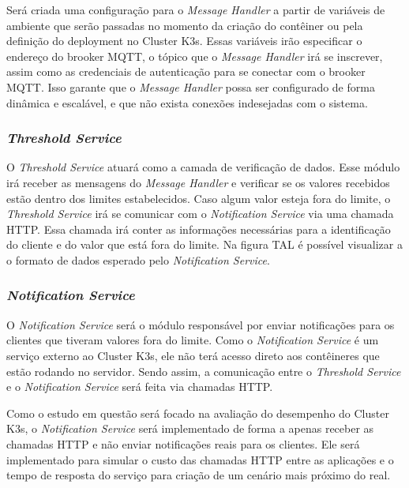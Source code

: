 Será criada uma configuração para o \textit{Message Handler} a partir de variáveis de ambiente que serão passadas no momento da criação do contêiner ou pela definição do deployment no Cluster K3s.
Essas variáveis irão especificar o endereço do brooker MQTT, o tópico que o \textit{Message Handler} irá se inscrever, assim como as credenciais de autenticação para se conectar com o brooker MQTT. 
Isso garante que o \textit{Message Handler} possa ser configurado de forma dinâmica e escalável, e que não exista conexões indesejadas com o sistema.

\subsubsection{\textit{Threshold Service}}

O \textit{Threshold Service} atuará como a camada de verificação de dados. 
Esse módulo irá receber as mensagens do \textit{Message Handler} e verificar se os valores recebidos estão dentro dos limites estabelecidos. 
Caso algum valor esteja fora do limite, o \textit{Threshold Service} irá se comunicar com o \textit{Notification Service} via uma chamada HTTP.
Essa chamada irá conter as informações necessárias para a identificação do cliente e do valor que está fora do limite.
Na figura TAL é possível visualizar a o formato de dados esperado pelo \textit{Notification Service}.

\subsubsection{\textit{Notification Service}}

O \textit{Notification Service} será o módulo responsável por enviar notificações para os clientes que tiveram valores fora do limite.
Como o \textit{Notification Service} é um serviço externo ao Cluster K3s, ele não terá acesso direto aos contêineres que estão rodando no servidor. 
Sendo assim, a comunicação entre o \textit{Threshold Service} e o \textit{Notification Service} será feita via chamadas HTTP.

Como o estudo em questão será focado na avaliação do desempenho do Cluster K3s, o \textit{Notification Service} será implementado de forma a apenas receber as chamadas HTTP e não enviar notificações reais para os clientes.
Ele será implementado para simular o custo das chamadas HTTP entre as aplicações e o tempo de resposta do serviço para criação de um cenário mais próximo do real.


